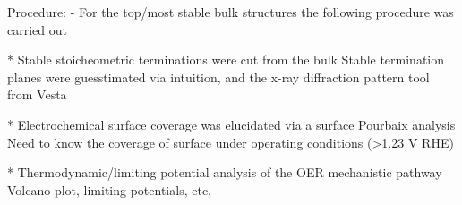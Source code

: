 Procedure:
- For the top/most stable bulk structures the following procedure was carried out

* Stable stoicheometric terminations were cut from the bulk
    Stable termination planes were guesstimated via intuition, and the x-ray diffraction pattern tool from Vesta

* Electrochemical surface coverage was elucidated via a surface Pourbaix analysis
    Need to know the coverage of surface under operating conditions (>1.23 V RHE)

* Thermodynamic/limiting potential analysis of the OER mechanistic pathway
    Volcano plot, limiting potentials, etc.

